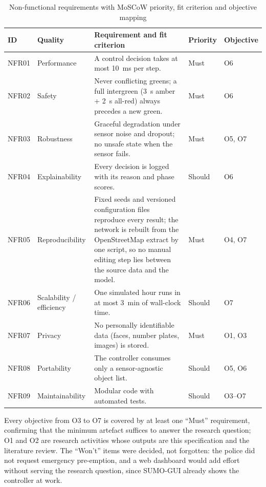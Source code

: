 \begin{table}[htbp]
\centering
\caption[Non-functional requirements with MoSCoW priority]{Non-functional requirements with MoSCoW priority, fit criterion and objective mapping}
\label{tab:srs-nfr}
\small
\renewcommand{\arraystretch}{1.1}
\begin{tabularx}{\textwidth}{@{}p{1.2cm}>{\raggedright\arraybackslash}p{2.5cm}>{\raggedright\arraybackslash}Xp{1.3cm}p{1.65cm}@{}}
\toprule
\textbf{ID} & \textbf{Quality} & \textbf{Requirement and fit criterion} & \textbf{Priority} & \textbf{Objective}\\
\midrule
NFR01 & Performance & A control decision takes at most 10~ms per step. & Must & O6\\
NFR02 & Safety & Never conflicting greens; a full intergreen (3~s amber + 2~s all-red) always precedes a new green. & Must & O6\\
NFR03 & Robustness & Graceful degradation under sensor noise and dropout; no unsafe state when the sensor fails. & Must & O5, O7\\
NFR04 & Explainability & Every decision is logged with its reason and phase scores. & Should & O6\\
NFR05 & Reproducibility & Fixed seeds and versioned configuration files reproduce every result; the network is rebuilt from the OpenStreetMap extract by one script, so no manual editing step lies between the source data and the model. & Must & O4, O7\\
NFR06 & Scalability / efficiency & One simulated hour runs in at most 3~min of wall-clock time. & Should & O7\\
NFR07 & Privacy & No personally identifiable data (faces, number plates, images) is stored. & Must & O1, O3\\
NFR08 & Portability & The controller consumes only a sensor-agnostic object list. & Should & O5, O6\\
NFR09 & Maintainability & Modular code with automated tests. & Should & O3--O7\\
\bottomrule
\end{tabularx}
\end{table}

Every objective from O3 to O7 is covered by at least one ``Must'' requirement, confirming that the minimum artefact suffices to answer the research question; O1 and O2 are research activities whose outputs are this specification and the literature review. The ``Won't'' items were decided, not forgotten: the police did not request emergency pre-emption, and a web dashboard would add effort without serving the research question, since SUMO-GUI already shows the controller at work.

